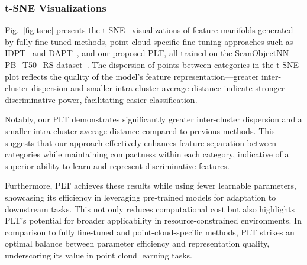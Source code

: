\subsubsection{t-SNE Visualizations}  
Fig.~\ref{fig:tsne} presents the t-SNE~\cite{van2008visualizing} visualizations of feature manifolds generated by fully fine-tuned methods, point-cloud-specific fine-tuning approaches such as IDPT~\cite{zha2023instance} and DAPT~\cite{zhou2024dynamic}, and our proposed PLT, all trained on the ScanObjectNN PB\_T50\_RS dataset~\cite{uy2019revisiting}. The dispersion of points between categories in the t-SNE plot reflects the quality of the model's feature representation—greater inter-cluster dispersion and smaller intra-cluster average distance indicate stronger discriminative power, facilitating easier classification.

Notably, our PLT demonstrates significantly greater inter-cluster dispersion and a smaller intra-cluster average distance compared to previous methods. This suggests that our approach effectively enhances feature separation between categories while maintaining compactness within each category, indicative of a superior ability to learn and represent discriminative features.

Furthermore, PLT achieves these results while using fewer learnable parameters, showcasing its efficiency in leveraging pre-trained models for adaptation to downstream tasks. This not only reduces computational cost but also highlights PLT's potential for broader applicability in resource-constrained environments. In comparison to fully fine-tuned and point-cloud-specific methods, PLT strikes an optimal balance between parameter efficiency and representation quality, underscoring its value in point cloud learning tasks.





